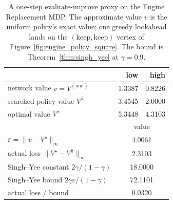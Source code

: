 \begin{table}[h]
\centering
\caption{A one-step evaluate-improve proxy on the Engine Replacement MDP. The approximate value $v$ is the uniform policy's exact value; one greedy lookahead lands on the $(\text{keep},\text{keep})$ vertex of Figure~\ref{fig:engine_policy_square}. The bound is Theorem~\ref{thm:singh_yee} at $\gamma = 0.9$.}
\label{tab:engine_hybrid_search}
\begin{tabular}{lrr}
\hline
 & low & high \\
\hline
network value $v = V^{(\mathrm{unif})}$ & 1.3387 & 0.8226 \\
searched policy value $V^{\hat\pi}$ & 3.4545 & 2.0000 \\
optimal value $V^\star$ & 5.3448 & 4.3103 \\
\hline
 & \multicolumn{2}{c}{value} \\
\hline
$\varepsilon = \|v - V^\star\|_\infty$ & \multicolumn{2}{c}{4.0061} \\
actual loss $\|V^\star - V^{\hat\pi}\|_\infty$ & \multicolumn{2}{c}{2.3103} \\
Singh--Yee constant $2\gamma/(1-\gamma)$ & \multicolumn{2}{c}{18.0000} \\
Singh--Yee bound $2\gamma\varepsilon/(1-\gamma)$ & \multicolumn{2}{c}{72.1101} \\
actual loss / bound & \multicolumn{2}{c}{0.0320} \\
\hline
\end{tabular}
\end{table}
